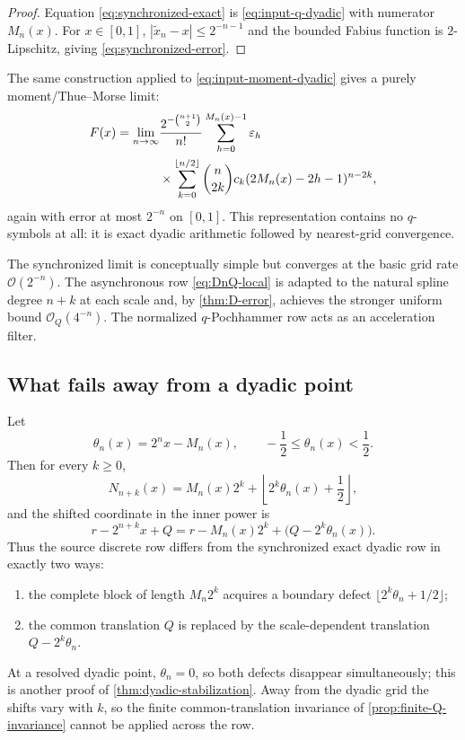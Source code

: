 \documentclass[11pt,oneside]{article}
\theoremstyle{definition}
\theoremstyle{remark}
\newcommand{\bigO}{\mathcal O}
\newcommand{\tm}{\varepsilon}
\begin{document}
\begin{proof}
Equation \eqref{eq:synchronized-exact} is
\eqref{eq:input-q-dyadic} with numerator $M_n(x)$.  For $x\in[0,1]$,
$|\widetilde x_n-x|\le2^{-n-1}$ and the bounded Fabius function is $2$-Lipschitz, giving
\eqref{eq:synchronized-error}.
\end{proof}

The same construction applied to \eqref{eq:input-moment-dyadic} gives a purely
moment/Thue--Morse limit:
\begin{align}
 F(x)=\lim_{n\to\infty}
 &\frac{2^{-\binom{n+1}{2}}}{n!}
 \sum_{h=0}^{M_n(x)-1}\tm_h                              \notag\\
 &\times\sum_{k=0}^{\lfloor n/2\rfloor}
 \binom n{2k}c_k(2M_n(x)-2h-1)^{n-2k},                   \label{eq:synchronized-moment-limit}
\end{align}
again with error at most $2^{-n}$ on $[0,1]$.  This representation contains no $q$-symbols at
all: it is exact dyadic arithmetic followed by nearest-grid convergence.

The synchronized limit is conceptually simple but converges at the basic grid rate
$\bigO(2^{-n})$.  The asynchronous row \eqref{eq:DnQ-local} is adapted to the natural spline
degree $n+k$ at each scale and, by \cref{thm:D-error}, achieves the stronger uniform bound
$\bigO_Q(4^{-n})$.  The normalized $q$-Pochhammer row acts as an acceleration filter.

\subsection{What fails away from a dyadic point}

Let
\begin{equation}
 \theta_n(x)=2^nx-M_n(x),
 \qquad -\frac12\le\theta_n(x)<\frac12.                  \label{eq:theta-n}
\end{equation}
Then for every $k\ge0$,
\begin{equation}
 N_{n+k}(x)
 =M_n(x)2^k+\left\lfloor2^k\theta_n(x)+\frac12\right\rfloor, \label{eq:cutoff-defect}
\end{equation}
and the shifted coordinate in the inner power is
\begin{equation}
 r-2^{n+k}x+Q
 =r-M_n(x)2^k+\bigl(Q-2^k\theta_n(x)\bigr).               \label{eq:shift-defect}
\end{equation}
Thus the source discrete row differs from the synchronized exact dyadic row in exactly two
ways:
\begin{enumerate}
\item the complete block of length $M_n2^k$ acquires a boundary defect
      $\lfloor2^k\theta_n+1/2\rfloor$;
\item the common translation $Q$ is replaced by the scale-dependent translation
      $Q-2^k\theta_n$.
\end{enumerate}
At a resolved dyadic point, $\theta_n=0$, so both defects disappear simultaneously; this is
another proof of \cref{thm:dyadic-stabilization}.  Away from the dyadic grid the shifts vary
with $k$, so the finite common-translation invariance of
\cref{prop:finite-Q-invariance} cannot be applied across the row.
\end{document}
